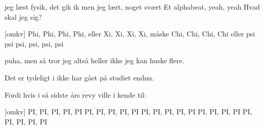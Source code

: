 \documentclass[a4paper,11pt]{article}
\begin{document}
\begin{song}
   jeg læst fysik, det gik ik
  men jeg lært, noget svært
  Et alphabeat, yeah, yeah
  Hvad skal jeg sig?

  [omkv] Phi, Phi, Phi, Phi, eller
  Xi, Xi, Xi, Xi, måske
  Chi, Chi, Chi, Chi eller psi
  psi psi, psi, psi, psi
\end{song}

\begin{sketch}
 puha, men så tror jeg altså heller ikke jeg kan huske flere.

 Det er tydeligt i ikke har gået på studiet endnu.

 Fordi hvis i så sidste års revy ville i kende til:
\end{sketch}

\begin{song}
  [omkv] PI, PI, PI, PI, PI
  PI, PI, PI, PI, PI
  PI, PI, PI, PI, PI
  PI, PI, PI, PI
  PI, PI, PI, PI, PI
\end{song}
\end{document}
